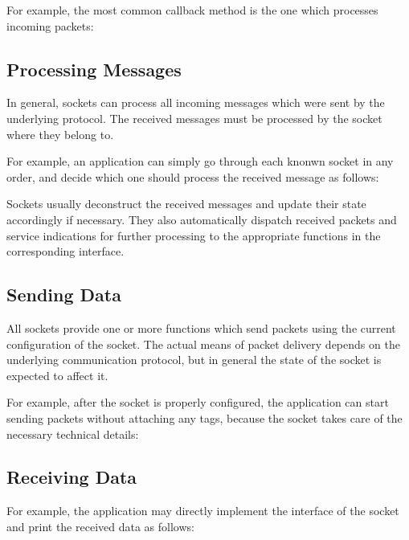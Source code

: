 For example, the most common callback method is the one which processes incoming
packets:


\subsection*{Processing Messages}

In general, sockets can process all incoming messages which were sent by the
underlying protocol. The received messages must be processed by the socket where
they belong to.

For example, an application can simply go through each knonwn socket in any
order, and decide which one should process the received message as follows:


Sockets usually deconstruct the received messages and update their state
accordingly if necessary. They also automatically dispatch received packets and
service indications for further processing to the appropriate functions in the
corresponding  interface.

\subsection*{Sending Data}

All sockets provide one or more  functions which send packets using
the current configuration of the socket. The actual means of packet delivery
depends on the underlying communication protocol, but in general the state of
the socket is expected to affect it.

For example, after the socket is properly configured, the application can start
sending packets without attaching any tags, because the socket takes care of
the necessary technical details:


\subsection*{Receiving Data}

For example, the application may directly implement the 
interface of the socket and print the received data as follows:


